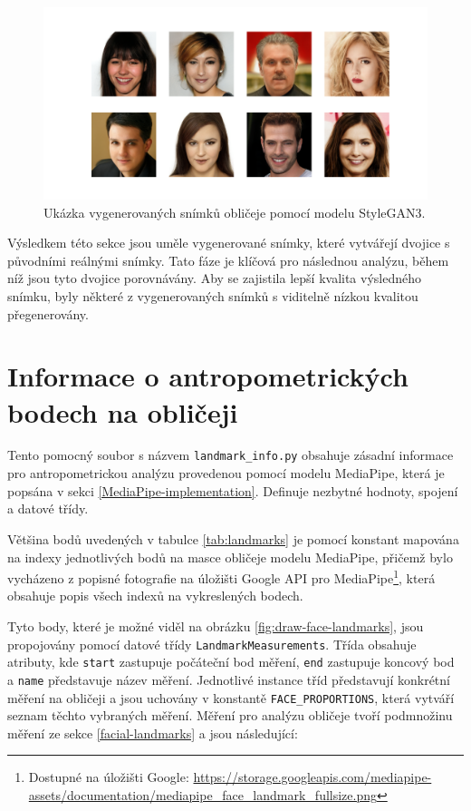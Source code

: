 \begin{figure}[hbt]
	\centering
	\includegraphics[width=1\textwidth]{obrazky-figures/gen-images-grid.png}
	\caption{Ukázka vygenerovaných snímků obličeje pomocí modelu StyleGAN3.}
        \label{fig:stylegan3-generated-examples}
\end{figure}

\noindent Výsledkem této sekce jsou uměle vygenerované snímky, které vytvářejí dvojice s původními reálnými snímky. Tato fáze je klíčová pro následnou analýzu, během níž jsou tyto dvojice porovnávány. Aby se zajistila lepší kvalita výsledného snímku, byly některé z vygenerovaných snímků s viditelně nízkou kvalitou přegenerovány.

\section{Informace o antropometrických bodech na obličeji}
\label{landmark-info}

Tento pomocný soubor s názvem \texttt{landmark\_info.py} obsahuje zásadní informace pro antropometrickou analýzu provedenou pomocí modelu MediaPipe, která je popsána v sekci \ref{MediaPipe-implementation}. Definuje nezbytné hodnoty, spojení a datové třídy.

Většina bodů uvedených v tabulce \ref{tab:landmarks} je pomocí konstant mapována na indexy jednotlivých bodů na masce obličeje modelu MediaPipe, přičemž bylo vycházeno z popisné fotografie na úložišti Google API pro MediaPipe\footnote{Dostupné na úložišti Google: \url{https://storage.googleapis.com/mediapipe-assets/documentation/mediapipe_face_landmark_fullsize.png}}, která obsahuje popis všech indexů na vykreslených bodech.

Tyto body, které je možné viděl na obrázku \ref{fig:draw-face-landmarks}, jsou propojovány pomocí datové třídy \texttt{LandmarkMeasurements}. Třída obsahuje atributy, kde \texttt{start} zastupuje počáteční bod měření, \texttt{end} zastupuje koncový bod a \texttt{name} představuje název měření. Jednotlivé instance tříd představují konkrétní měření na obličeji a jsou uchovány v konstantě \texttt{FACE\_PROPORTIONS}, která vytváří seznam těchto vybraných měření. Měření pro analýzu obličeje tvoří podmnožinu měření ze sekce \ref{facial-landmarks} a jsou následující:

